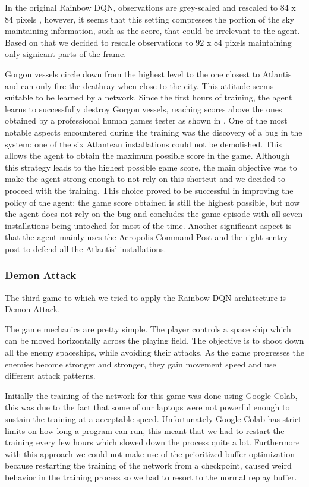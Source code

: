 \documentclass[10pt,twocolumn,letterpaper]{article}
\begin{document}
In the original Rainbow DQN, observations are grey-scaled and rescaled to $84$ x $84$ pixels \cite{DBLP:journals/corr/abs-1710-02298}, however, it seems that this setting compresses the portion of the sky maintaining information, such as the score, that could be irrelevant to the agent. Based on that we decided to rescale observations  to $92$ x $84$ pixels maintaining only signicant parts of the frame.

Gorgon vessels circle down from the highest level to the one closest to Atlantis and can only fire the deathray when close to the city. This attitude seems suitable to be learned by a network. Since the first hours of training, the agent learns to successfully destroy Gorgon vessels, reaching scores above the ones obtained by a professional human games tester as shown in \cite{humancontrol}.  One of the most notable aspects encountered during the training was the discovery of a bug in the system: one of the six Atlantean installations could not be demolished. This allows the agent to obtain the maximum possible score in the game. Although this strategy leads to the highest possible game score, the main objective was to make the agent strong enough to not rely on this shortcut and we decided to proceed with the training. This choice proved to be successful in improving the policy of the agent: the game score obtained is still the highest possible, but now the agent does not rely on the bug and concludes the game episode with all seven installations being untoched for most of the time. Another significant aspect is that the agent mainly uses the Acropolis Command Post and the right sentry post to defend all the Atlantis' installations.

\subsubsection{Demon Attack}
\label{demon_attack}
The third game to which we tried to apply the Rainbow DQN architecture is Demon Attack.

The game mechanics are pretty simple. The player controls a space ship which can be moved horizontally across the playing field. The objective is to shoot down all the enemy spaceships, while avoiding their attacks. As the game progresses the enemies become stronger and stronger, they gain movement speed and use different attack patterns.

Initially the training of the network for this game was done using Google Colab, this was due to the fact that some of our laptops were not powerful enough to sustain the training at a acceptable speed. Unfortunately Google Colab has strict limits on how long a program can run, this meant that we had to restart the training every few hours which slowed down the process quite a lot. Furthermore with this approach we could not make use of the prioritized buffer optimization because restarting the training of the network from a checkpoint, caused weird behavior in the training process so we had to resort to the normal replay buffer.
\end{document}
